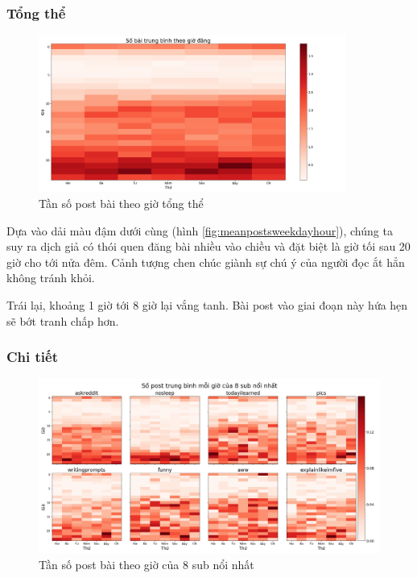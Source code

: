 \documentclass[10pt,a4paper]{article}
\begin{document}
\subsubsection{Tổng thể}
\begin{figure}[ht]
    \centering
    \includegraphics[width=0.9\textwidth]{img/MeanPostsWeekdayHour.png}
    \caption{Tần số post bài theo giờ tổng thể}
    \label{fig:meanpostsweekdayhour}
\end{figure}

Dựa vào dải màu đậm dưới cùng (hình \eqref{fig:meanpostsweekdayhour}), chúng ta suy ra dịch giả có thói quen đăng bài nhiều vào chiều và đặt biệt là giờ tối sau 20 giờ cho tới nửa đêm. Cảnh tượng chen chúc giành sự chú ý của người đọc ắt hẳn không tránh khỏi.

Trái lại, khoảng 1 giờ tới 8 giờ lại vắng tanh. Bài post vào giai đoạn này hứa hẹn sẽ bớt tranh chấp hơn.
\subsubsection{Chi tiết}
\begin{figure}[ht]
    \centering
    \includegraphics[width=\textwidth]{img/MeanPostsWeekdayHourPerSub.png}
    \caption{Tần số post bài theo giờ của 8 sub nổi nhất}
    \label{fig:meanpostsweekdayhourpersub}
\end{figure}
\end{document}
